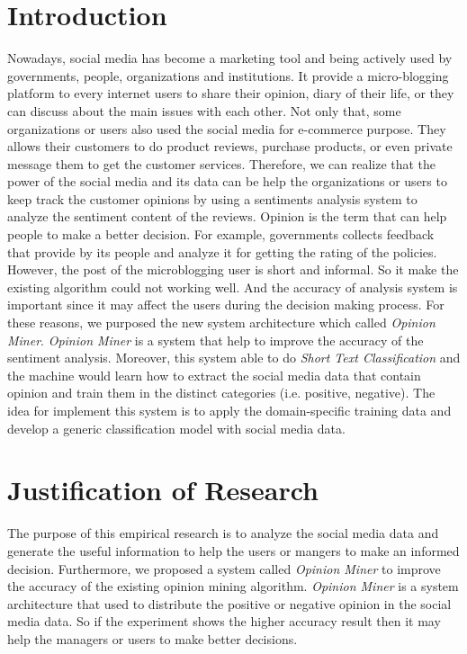 \documentclass[a4paper,12pt]{article}
\begin{document}
\section{Introduction}
\hspace{1cm}Nowadays, social media has become a marketing tool and being actively used by governments, people, organizations and institutions. It provide a micro-blogging platform to every internet users to share their opinion, diary of their life, or they can discuss about the main issues with each other. Not only that, some organizations or users also used the social media for e-commerce purpose. They allows their customers to do product reviews, purchase products, or even private message them to get the customer services. Therefore, we can realize that the power of the social media and its data can be help the organizations or users to keep track the customer opinions by using a sentiments analysis system to analyze the sentiment content of the reviews. 
Opinion is the term that can help people to make a better decision. For example, governments collects feedback that provide by its people and analyze it for getting the rating of the policies. However, the post of the microblogging user is short and informal. So it make the existing algorithm could not working well. And the accuracy of analysis system is important since it may affect the users during the decision making process. For these reasons, we purposed the new system architecture which called \textit{Opinion Miner}.
\textit{Opinion Miner} is a system that help to improve the accuracy of the sentiment analysis. Moreover, this system able to do \textit{Short Text Classification} and the machine would learn how to extract the social media data that contain opinion and train them in the distinct categories (i.e. positive, negative). The idea for implement this system is to apply the domain-specific training data and develop a generic classification model with social media data.
\section{Justification of Research}
\hspace*{1cm}The purpose of this empirical research is to analyze the social media data and generate the useful information to help the users or mangers to make an informed decision. Furthermore, we proposed a system called \textit{Opinion Miner} to improve the accuracy of the existing opinion mining algorithm. \textit{Opinion Miner} is a system architecture that used to distribute the positive or negative opinion in the social media data. So if the experiment shows the higher accuracy result then it may help the managers or users to make better decisions.
\end{document}
